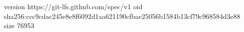version https://git-lfs.github.com/spec/v1
oid sha256:ccc9cdac245e8e8f6092d1aa621190cfbae25056b1584b13cf79c968584d3e88
size 76953
